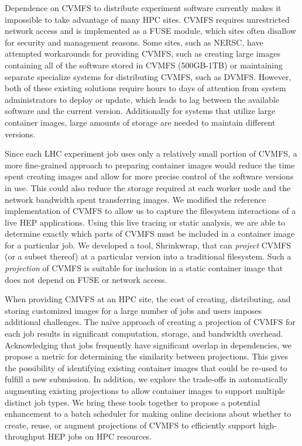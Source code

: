 \documentclass[conference]{IEEEtran}
\begin{document}
Dependence on CVMFS to distribute experiment software currently makes it impossible to take advantage of many HPC sites.
CVMFS requires unrestricted network access and is implemented as a FUSE module,
which sites often disallow for security and management reasons.
Some sites, such as NERSC,
have attempted workarounds for providing CVMFS,
such as creating large images containing all of the software stored in CVMFS (500GB-1TB) or
maintaining separate specialize systems for distributing 
CVMFS, such as DVMFS.
However, both of these existing solutions require 
hours to days of attention from system administrators to deploy or update,
which leads to lag between the available software and the current version.
Additionally for systems that utilize large container images, large amounts of storage are needed to maintain different versions.

Since each LHC experiment job uses 
only a relatively small portion of CVMFS,
a more fine-grained approach to preparing container images would reduce the time spent creating images and allow for more precise control of the software versions in use.
This could also reduce the storage required at each worker node and the network bandwidth spent transferring images.
We modified the reference implementation of CVMFS to allow us to capture the filesystem interactions of a live HEP applications.
Using this live tracing or static analysis,
we are able to determine exactly which parts of CVMFS must be included in a container image for a particular job.
We developed a tool, Shrinkwrap, that can \emph{project} CVMFS (or a subset thereof) at a particular version into a traditional filesystem.
Such a \emph{projection} of CVMFS is suitable for inclusion in a static container image that does not depend on FUSE or network access.

When providing CMVFS at an HPC site,
the cost of creating, distributing, and storing customized images for a large number of jobs and users imposes additional challenges.
The na\"{i}ve approach of creating a projection of CVMFS for each job results in significant computation, storage, and bandwidth overhead.
Acknowledging that jobs frequently have significant overlap in dependencies,
we propose a metric for determining the similarity between projections.
This gives the possibility of identifying existing container images that could be re-used to fulfill a new submission.
In addition, we explore the trade-offs in automatically augmenting existing projections to allow container images to support multiple distinct job types.
We bring these tools together to propose a potential enhancement to a batch scheduler for making online decisions about whether to create, reuse, or augment projections of CVMFS to efficiently support high-throughput HEP jobs on HPC resources. 
\end{document}
